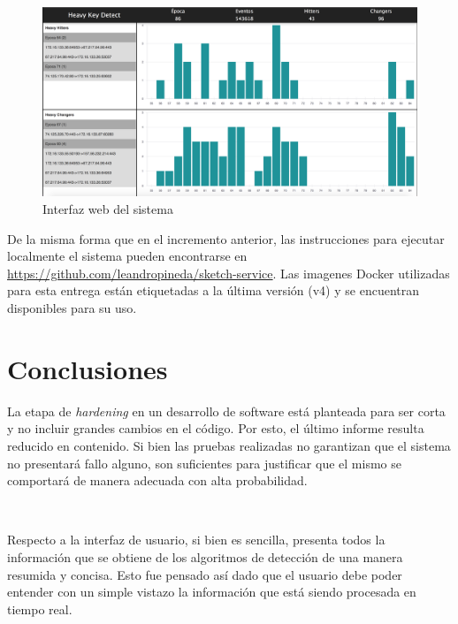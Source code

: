 \documentclass[a4paper,10pt, oneside]{article}
\begin{document}
\begin{figure}[htbp]
	\centering
	\includegraphics[width=1\textwidth]{./graph/ui.png}
	\caption{Interfaz web del sistema}
	\label{fig:ui}
\end{figure}

De la misma forma que en el incremento anterior, las instrucciones para ejecutar localmente el sistema pueden encontrarse en \hyperref[https://github.com/leandropineda/sketch-service]{https://github.com/leandropineda/sketch-service}. Las imagenes Docker utilizadas para esta entrega están etiquetadas a la última versión (v4) y se encuentran disponibles para su uso.

\newpage
\section{Conclusiones}
La etapa de \textit{hardening} en un desarrollo de software está planteada para ser corta y no incluir grandes cambios en el código. Por esto, el último informe resulta reducido en contenido. Si bien las pruebas realizadas no garantizan que el sistema no presentará fallo alguno, son suficientes para justificar que el mismo se comportará de manera adecuada con alta probabilidad.

\

Respecto a la interfaz de usuario, si bien es sencilla, presenta todos la información que se obtiene de los algoritmos de detección de una manera resumida y concisa. Esto fue pensado así dado que el usuario debe poder entender con un simple vistazo la información que está siendo procesada en tiempo real.
\end{document}
